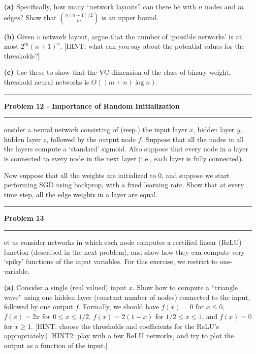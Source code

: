 \documentclass[11pt]{article}
\newcommand\question[2]{\vspace{.25in}\hrule\textbf{#1}\vspace{.5em}\hrule\vspace{.10in}}
\renewcommand\part[1]{\vspace{.10in}\textbf{(#1)}}
\begin{document}
\part{a} Specifically, how many ``network layouts'' can there be with $n$ nodes and $m$ edges? Show that $n(n-1)/2 \choose m$ is an upper bound.


\part{b} Given a network layout, argue that the number of `possible networks' is at most $2^m(n+1)^n$. [HINT: what can you say about the potential values for the thresholds?]


\part{c} Use these to show that the VC dimension of the class of binary-weight, threshold neural networks is $O((m+n)\log ⁡n)$.


\question{Problem 12 - Importance of Random Initialization}

Consider a neural network consisting of (resp.) the input layer $x$, hidden layer $y$, hidden layer $z$, followed by the output node $f$. Suppose that all the nodes in all the layers compute a `standard' sigmoid. Also suppose that every node in a layer is connected to every node in the next layer (i.e., each layer is fully connected).

Now suppose that all the weights are initialized to 0, and suppose we start performing SGD using backprop, with a fixed learning rate. Show that at every time step, all the edge weights in a layer are equal.


\question{Problem 13}

Let us consider networks in which each node computes a rectified linear (ReLU) function (described in the next problem), and show how they can compute very `spiky' functions of the input variables. For this exercise, we restrict to one-variable.

\part{a} Consider a single (real valued) input $x$. Show how to compute a ``triangle wave'' using one hidden layer (constant number of nodes) connected to the input, followed by one output $f$. Formally, we should have $f(x) = 0$ for $x \leq 0$, $f(x) = 2x$ for $0 \leq x \leq 1/2$, $f(x) = 2(1 - x)$ for $1/2 \leq x \leq 1$, and $f(x) = 0$ for $x \geq 1$. [HINT: choose the thresholds and coefficients for the ReLU's appropriately.] [HINT2: play with a few ReLU networks, and try to plot the output as a function of the input.]
\end{document}
